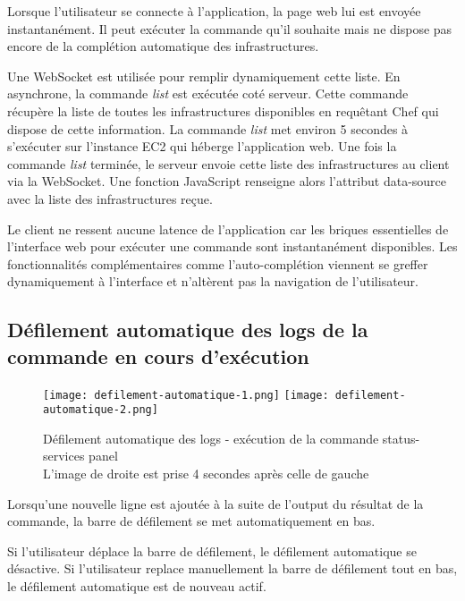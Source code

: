 Lorsque l'utilisateur se connecte à l'application, la page web lui est envoyée
instantanément. Il peut exécuter la commande qu'il souhaite mais ne
dispose pas encore de la complétion automatique des infrastructures.

Une WebSocket est utilisée pour remplir dynamiquement cette liste.
En asynchrone, la commande \textit{list} est exécutée coté serveur.
Cette commande récupère la liste de toutes les infrastructures disponibles en
requêtant Chef qui dispose de cette information. La commande \textit{list} met
environ 5 secondes à s'exécuter sur l'instance EC2 qui héberge l'application
web.
Une fois la commande \textit{list} terminée, le serveur envoie cette liste des
infrastructures au client via la WebSocket.
Une fonction JavaScript renseigne alors l'attribut data-source avec
la liste des infrastructures reçue.

Le client ne ressent aucune latence de l'application car les briques essentielles
de l'interface web pour exécuter une commande sont instantanément disponibles.
Les fonctionnalités complémentaires comme l'auto-complétion viennent se greffer
dynamiquement à l'interface et n'altèrent pas la navigation de l'utilisateur.


\subsection{Défilement automatique des logs de la commande en cours d'exécution}

\begin{figure}[H]
  \texttt{[image: defilement-automatique-1.png]}
  \texttt{[image: defilement-automatique-2.png]}
  \caption{Défilement automatique des logs - exécution de la commande
    status-services panel\\L'image de droite est prise 4 secondes après celle de gauche}
\end{figure}

Lorsqu'une nouvelle ligne est ajoutée à la suite de l'output du résultat de la
commande, la barre de défilement se met automatiquement en bas.

Si l'utilisateur déplace la barre de défilement, le défilement automatique se
désactive.
Si l'utilisateur replace manuellement la barre de défilement tout en bas,
le défilement automatique est de nouveau actif.

